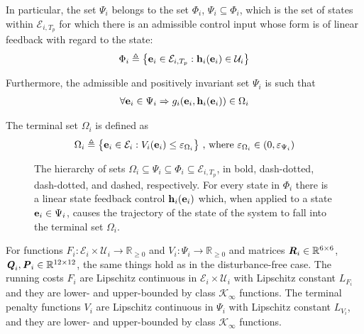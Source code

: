 In particular, the set $\Psi_i$ belongs to the set
$\Phi_i$, $\Psi_i \subseteq \Phi_i$, which is the set of states within
$\mathcal{E}_{i,T_p}$ for which there is an admissible control input whose form
is of linear feedback with regard to the state:
\begin{align}
  \Phi_i \triangleq \big\{\bm{\mathbf{e}}_i \in \mathcal{E}_{i,T_p} : \bm{\mathbf{h}}_i(\bm{\mathbf{e}}_i) \in \mathcal{U}_i \big\}
\end{align}

Furthermore, the admissible and positively invariant set $\Psi_i$ is such that
\begin{align}
\forall \bm{\mathbf{e}}_i \in \Psi_i \Rightarrow g_i(\bm{\mathbf{e}}_i, \bm{\mathbf{h}}_i(\bm{\mathbf{e}}_i)) \in \Omega_i
\end{align}

The terminal set $\Omega_i$ is defined as
\begin{align}
  \Omega_i \triangleq \big\{\bm{\mathbf{e}}_i \in \mathcal{E}_i : V_i(\bm{\mathbf{e}}_i)
    \leq \varepsilon_{\Omega_i}\big\}\ \text{, where } \varepsilon_{\Omega_i} \in (0, \varepsilon_{\Psi_i})
\end{align}


\begin{figure}[ht!]
  \centering
  
  \caption{The hierarchy of sets
  $\Omega_i \subseteq \Psi_i \subseteq \Phi_i \subseteq \mathcal{E}_{i,T_p}$,
  in bold, dash-dotted, dash-dotted, and dashed, respectively.
  For every state in $\Phi_i$ there is a linear state feedback control
  $\bm{\mathbf{h}}_i(\bm{\mathbf{e}}_i)$ which, when applied to a state
  $\bm{\mathbf{e}}_i \in \Psi_i$, causes the trajectory of the state of the system to
  fall into the terminal set $\Omega_i$.}
\end{figure}


For functions
$F_i : \mathcal{E}_i \times \mathcal{U}_i \to \mathbb{R}_{\geq 0}$ and
$V_i: \Psi_i \to \mathbb{R}_{\geq 0}$ and matrices
$\bm{\mathit{R}}_i \in \mathbb{R}^{6 \times 6}$,
$\bm{\mathit{Q}}_i, \bm{\mathit{P}}_i \in \mathbb{R}^{12 \times 12}$, the same things hold
as in the disturbance-free case. The running costs $F_i$ are
Lipschitz continuous in $\mathcal{E}_i \times \mathcal{U}_i$ with Lipschitz
constant $L_{F_i}$ and they are lower- and upper-bounded by class
$\mathcal{K}_{\infty}$ functions. The terminal penalty functions $V_i$ are
Lipschitz continuous in $\Psi_i$ with Lipschitz constant $L_{V_i}$, and they are
lower- and upper-bounded by class $\mathcal{K}_{\infty}$ functions.


